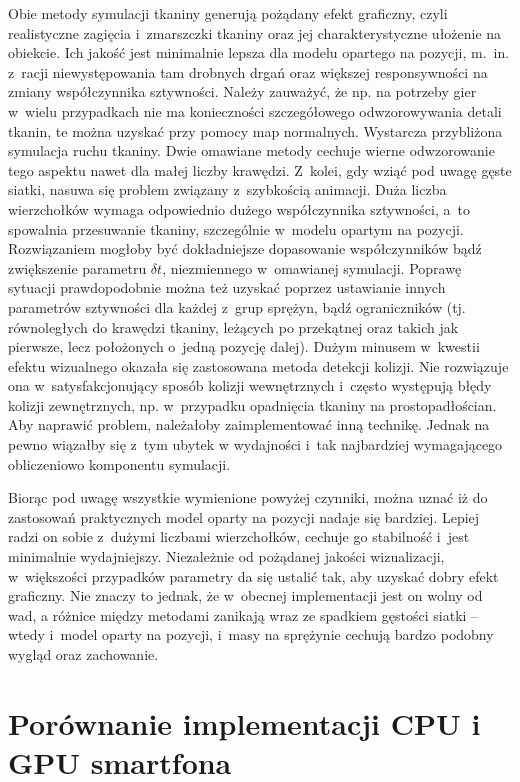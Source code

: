 	Obie metody symulacji tkaniny generują pożądany efekt graficzny, czyli realistyczne zagięcia i~zmarszczki tkaniny oraz jej charakterystyczne ułożenie na obiekcie. Ich jakość jest minimalnie lepsza dla modelu opartego na pozycji, m.~in. z~racji niewystępowania tam drobnych drgań oraz większej responsywności na zmiany współczynnika sztywności. Należy zauważyć, że np. na potrzeby gier w~wielu przypadkach nie ma konieczności szczegółowego odwzorowywania detali tkanin, te można uzyskać przy pomocy map normalnych. Wystarcza przybliżona symulacja ruchu tkaniny. Dwie omawiane metody cechuje wierne odwzorowanie tego aspektu nawet dla małej liczby krawędzi. Z~kolei, gdy wziąć pod uwagę gęste siatki, nasuwa się problem związany z~szybkością animacji. Duża liczba wierzchołków wymaga odpowiednio dużego współczynnika sztywności, a~to spowalnia przesuwanie tkaniny, szczególnie w~modelu opartym na pozycji. Rozwiązaniem mogłoby być dokładniejsze dopasowanie współczynników bądź zwiększenie parametru \( \delta t \), niezmiennego w~omawianej symulacji. Poprawę sytuacji prawdopodobnie można też uzyskać poprzez ustawianie innych parametrów sztywności dla każdej z~grup sprężyn, bądź ograniczników (tj. równoległych do krawędzi tkaniny, leżących po przekątnej oraz takich jak pierwsze, lecz położonych o~jedną pozycję dalej). Dużym minusem w~kwestii efektu wizualnego okazała się zastosowana metoda detekcji kolizji. Nie rozwiązuje ona w~satysfakcjonujący sposób kolizji wewnętrznych i~często występują błędy kolizji zewnętrznych, np. w~przypadku opadnięcia tkaniny na prostopadłościan. Aby naprawić problem, należałoby zaimplementować inną technikę. Jednak na pewno wiązałby się z~tym ubytek w wydajności i~tak najbardziej wymagającego obliczeniowo komponentu symulacji.
	
	Biorąc pod uwagę wszystkie wymienione powyżej czynniki, można uznać iż do zastosowań praktycznych model oparty na pozycji nadaje się bardziej. Lepiej radzi on sobie z~dużymi liczbami wierzchołków, cechuje go stabilność i~jest minimalnie wydajniejszy. Niezależnie od pożądanej jakości wizualizacji, w~większości przypadków parametry da się ustalić tak, aby uzyskać dobry efekt graficzny. Nie znaczy to jednak, że w~obecnej implementacji jest on wolny od wad, a różnice między metodami zanikają wraz ze spadkiem gęstości siatki -- wtedy i~model oparty na pozycji, i~masy na sprężynie cechują bardzo podobny wygląd oraz zachowanie.
	
	\section{Porównanie implementacji CPU i GPU smartfona}
	\label{t:wnioski:cpu_vs_gpu}
	
